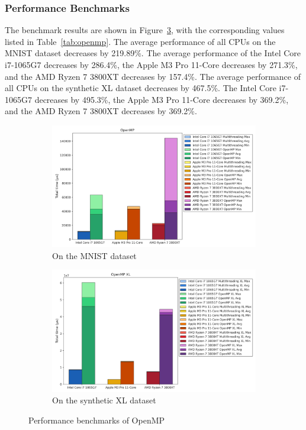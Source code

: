 \documentclass[modern,longauthor]{aastex7}
\begin{document}
\subsubsection{Performance Benchmarks}
The benchmark results are shown in Figure~\ref{fig:openmp}, with the corresponding values listed in Table~\ref{tab:openmp}. The average performance of all CPUs on the MNIST dataset decreases by 219.89\%. The average performance of the Intel Core i7-1065G7 decreases by 286.4\%, the Apple M3 Pro 11-Core decreases by 271.3\%, and the AMD Ryzen 7 3800XT decreases by 157.4\%. The average performance of all CPUs on the synthetic XL dataset decreases by 467.5\%. The Intel Core i7-1065G7 decreases by 495.3\%, the Apple M3 Pro 11-Core decreases by 369.2\%, and the AMD Ryzen 7 3800XT decreases by 369.2\%. 
\begin{figure}[htb!]
\centering
\begin{subfigure}{.5\textwidth}
  \centering
  \includegraphics[width=\linewidth]{Graphs/OpenMP.png}
  \caption{On the MNIST dataset}
 \label{fig:openmp_mnist}
\end{subfigure}%
\begin{subfigure}{.5\textwidth}
  \centering
  \includegraphics[width=\linewidth]{Graphs/OpenMP XL.png}
  \caption{On the synthetic XL dataset}
 \label{fig:openmp_xl}
\end{subfigure}
\caption{Performance benchmarks of OpenMP}
\label{fig:openmp}
\end{figure}
\end{document}
